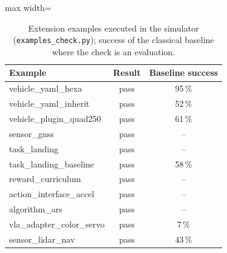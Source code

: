 \begin{table}[!htbp]\centering\small\caption{Extension examples executed in the simulator (\texttt{examples\_check.py}); success of the classical baseline where the check is an evaluation.}\label{tab:fw_examples}
\begin{adjustbox}{max width=\linewidth}\begin{tabular}{lcc}\toprule
Example & Result & Baseline success\\\midrule
vehicle\_yaml\_hexa & pass & 95\,\%\\
vehicle\_yaml\_inherit & pass & 52\,\%\\
vehicle\_plugin\_quad250 & pass & 61\,\%\\
sensor\_gnss & pass & --\\
task\_landing & pass & --\\
task\_landing\_baseline & pass & 58\,\%\\
reward\_curriculum & pass & --\\
action\_interface\_accel & pass & --\\
algorithm\_ars & pass & --\\
vla\_adapter\_color\_servo & pass & 7\,\%\\
sensor\_lidar\_nav & pass & 43\,\%\\
\bottomrule\end{tabular}\end{adjustbox}
\end{table}

